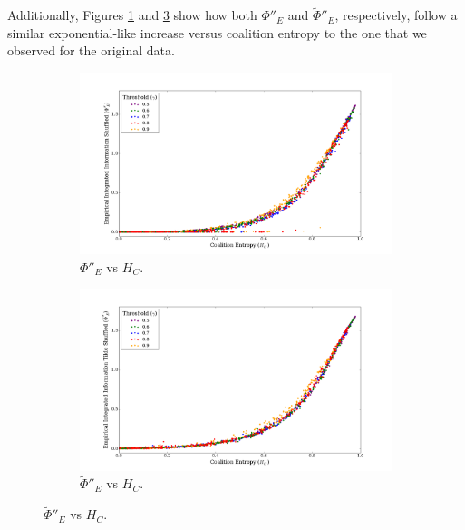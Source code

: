 \documentclass[a4paper,11pt]{article}
\begin{document}
Additionally, Figures \ref{fig:phi_shuffled_vs_hc} and \ref{fig:phi_tilde_shuffled_vs_hc} show how both $\Phi''_E$ and $\widetilde{\Phi}''_E$, respectively, follow a similar exponential-like increase versus coalition entropy to the one that we observed for the original data.

\begin{figure}[H] 
	\label{fig:phi-vs-hc-shuffled} 
	\begin{minipage}[b]{0.5\linewidth}
		\begin{figure}[H]
		\begin{center}
		\includegraphics[scale = 0.2]{figures/phi_shuffled_vs_hc}
		\caption{
			$\Phi''_E$ vs $H_C$.
			\label{fig:phi_shuffled_vs_hc}
		}
		\end{center}
		\end{figure}
		\vspace{2ex}
	\end{minipage}
	\begin{minipage}[b]{0.5\linewidth}
		\begin{figure}[H]
		\begin{center}
		\includegraphics[scale = 0.2]{figures/phi_tilde_shuffled_vs_hc}
		\caption{
			$\widetilde{\Phi}''_E$ vs $H_C$.
			\label{fig:phi_tilde_shuffled_vs_hc}
		}
		\end{center}
		\end{figure}
		\vspace{2ex}
	\end{minipage}
\end{figure}
\end{document}
